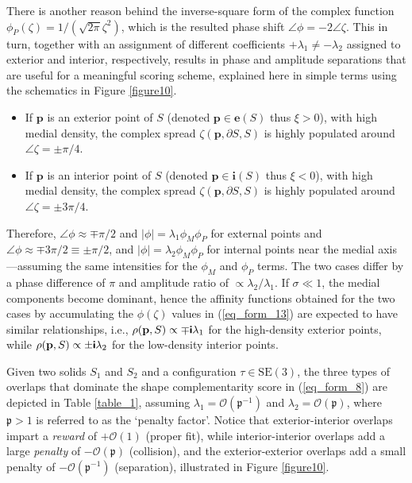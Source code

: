 \documentclass[article]{gmp2014}
\theoremstyle{definition}
\newcommand{\ii}{\text{\textsf{\textbf{i}}}}
\begin{document}
There is another reason behind the inverse-square form of the complex function $\phi_P(\zeta) = 1/(\sqrt{2\pi} \zeta^2)$, which is the resulted phase shift $\angle \phi = -2 \angle \zeta$. This in turn, together with an assignment of different coefficients $+\lambda_1 \neq -\lambda_2$ assigned to exterior and interior, respectively, results in phase and amplitude separations that are useful for a meaningful scoring scheme, explained here in simple terms using the schematics in Figure \ref{figure10}.
%
\begin{itemize}
    \item If $\mathbf{p}$ is an exterior point of $S$ (denoted $\mathbf{p} \in \mathbf{e}(S)$ thus $\xi > 0$), with high medial density, the complex spread $\zeta(\mathbf{p}, \partial S, S)$ is highly populated around $\angle \zeta = \pm \pi/4$.
    \item If $\mathbf{p}$ is an interior point of $S$ (denoted $\mathbf{p} \in \mathbf{i}(S)$ thus  $\xi < 0$), with high medial density, the complex spread $\zeta(\mathbf{p}, \partial S, S)$ is highly populated around $\angle \zeta = \pm 3\pi/4$.
\end{itemize}
%
Therefore, $\angle \phi \approx \mp \pi/2$ and $|\phi| = \lambda_1 \phi_M \phi_P$ for external points and $\angle \phi \approx \mp 3\pi/2 \equiv \pm \pi/2$, and $|\phi| = \lambda_2 \phi_M \phi_P$ for internal points near the medial axis---assuming the same intensities for the $\phi_M$ and $\phi_P$ terms.
%
The two cases differ by a phase difference of $\pi$ and amplitude ratio of $\propto \lambda_2/\lambda_1$. If $\sigma \ll 1$, the medial components become dominant, hence the affinity functions obtained for the two cases by accumulating the $\phi(\zeta)$ values in (\ref{eq_form_13}) are expected to have similar relationships, i.e., $\rho(\mathbf{p}, S) \propto \mp \ii \lambda_1$ for the high-density exterior points, while $\rho(\mathbf{p}, S) \propto \pm \ii \lambda_2$ for the low-density interior points.

Given two solids $S_1$ and $S_2$ and a configuration $\tau \in \mathrm{SE}(3)$, the three types of overlaps that dominate the shape complementarity score in (\ref{eq_form_8}) are depicted in Table \ref{table_1}, assuming $\lambda_1 = \mathcal{O}(\mathfrak{p}^{-1})$ and $\lambda_2 = \mathcal{O}(\mathfrak{p})$, where $\mathfrak{p}>1$ is referred to as the `penalty factor'. Notice that exterior-interior overlaps impart a {\it reward} of $+\mathcal{O}(1)$ (proper fit), while interior-interior overlaps add a large {\it penalty} of $-\mathcal{O}(\mathfrak{p})$ (collision), and the exterior-exterior overlaps add a small penalty of $-\mathcal{O}(\mathfrak{p}^{-1})$ (separation), illustrated in Figure \ref{figure10}.
\end{document}
